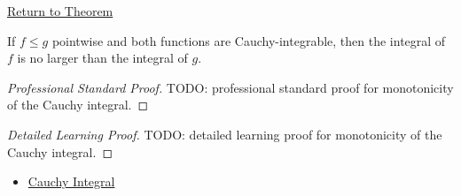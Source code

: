 \newpage
{}
\label{prf:cauchy-integral-monotonicity}

\begin{remark*}[Return]
\hyperref[thm:cauchy-integral-monotonicity]{Return to Theorem}
\end{remark*}

\begin{theorem*}
If \(f\le g\) pointwise and both functions are Cauchy-integrable, then the
integral of \(f\) is no larger than the integral of \(g\).
\end{theorem*}

\begin{proof}[Professional Standard Proof]
\LRAProofBodyStart
TODO: professional standard proof for monotonicity of the Cauchy integral.
\end{proof}

\begin{proof}[Detailed Learning Proof]
\LRAProofBodyStart
TODO: detailed learning proof for monotonicity of the Cauchy integral.
\end{proof}

\begin{remark*}
\end{remark*}

\begin{dependencies}
\begin{itemize}
  \item \hyperref[def:cauchy-integral]{Cauchy Integral}
\end{itemize}
\end{dependencies}

\clearpage
